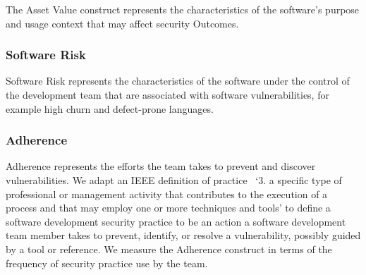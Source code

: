 The Asset Value construct represents the characteristics of the software's purpose and usage context that may affect security Outcomes.
 

\subsubsection{Software Risk}
Software Risk represents the characteristics of the software under the control of the development team that are associated with software vulnerabilities, for example high churn and defect-prone languages. 

\subsubsection{Adherence}
\label{sec:model_contruct_adherence}
Adherence represents the efforts the team takes to prevent and discover vulnerabilities. We adapt an IEEE definition of practice~\cite{ieee1990glossary} `3. a specific type of professional or management activity that contributes to 
the execution of a process and that may employ one or more techniques and tools' to define a software development security practice to be an action a software development team member takes to prevent, identify, or resolve a vulnerability, possibly guided by a tool or reference. We measure the Adherence construct in terms of the frequency  of security practice use by the team.  

